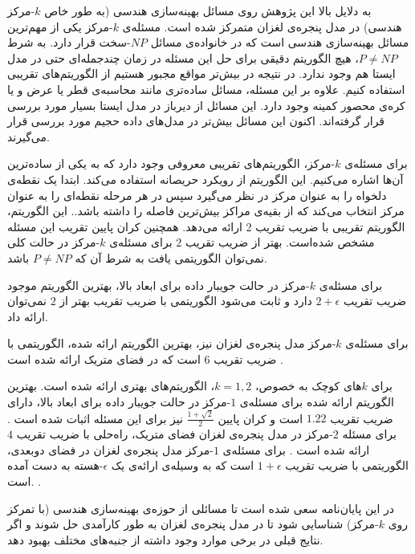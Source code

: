   به دلایل بالا این پژوهش روی مسائل بهینه‌سازی هندسی (به طور خاص $k$-مرکز هندسی) در مدل پنجره‌ی لغزان متمرکز شده است.
مسئله‌ی $k$-مرکز یکی از مهم‌ترین مسائل بهینه‌سازی هندسی است که در خانواده‌ی مسائل $NP$-سخت قرار دارد. به شرط $P \neq NP$، هیچ الگوریتم دقیقی برای حل این مسئله در زمان چندجمله‌ای حتی در مدل ایستا هم وجود ندارد. در نتیجه در بیش‌تر مواقع مجبور هستیم از الگوریتم‌های تقریبی   استفاده کنیم.
علاوه بر این مسئله، مسائل ساده‌تری مانند محاسبه‌ی قطر یا عرض و یا کره‌ی محصور کمینه وجود دارد. این مسائل  از دیرباز در مدل ایستا بسیار مورد بررسی قرار گرفته‌اند. اکنون این مسائل بیش‌تر در مدل‌های داده حجیم مورد بررسی قرار می‌گیرند.

برای مسئله‌ی $k$-مرکز، الگوریتم‌های تقریبی معروفی وجود دارد که به یکی از ساده‌ترین آن‌ها اشاره می‌کنیم.
این الگوریتم از رویکرد حریصانه  استفاده می‌کند.  ابتدا یک نقطه‌ی دلخواه را به عنوان مرکز در نظر می‌گیرد سپس در هر مرحله نقطه‌ای را به عنوان مرکز انتخاب می‌کند که از بقیه‌ی مراکز بیش‌ترین فاصله را داشته باشد..
این الگوریتم، الگوریتم تقریبی با ضریب تقریب 2 ارائه می‌دهد.
همچنین کران پایین تقریب این مسئله مشخص شده‌است. بهتر از ضریب تقریب $2$  برای مسئله‌ی $k$-مرکز در حالت کلی نمی‌توان الگوریتمی یافت به شرط آن که $P \neq NP$ باشد.

برای مسئله‌ی $k$-مرکز در حالت جویبار داده برای ابعاد بالا، بهترین الگوریتم موجود ضریب تقریب $2 + \epsilon$ دارد  و ثابت می‌شود الگوریتمی با ضریب تقریب بهتر از $2$ نمی‌توان ارائه داد.

برای مسئله‌ی $k$-مرکز مدل پنجره‌ی لغزان نیز، بهترین الگوریتم ارائه شده، الگوریتمی با ضریب تقریب $6$ است که  در فضای متریک ارائه شده است . 

برای $k$های کوچک به خصوص، $k =1, 2$، الگوریتم‌های بهتری ارائه شده است. بهترین الگوریتم ارائه شده برای مسئله‌ی $1$-مرکز در حالت جویبار داده برای ابعاد بالا، دارای ضریب تقریب $1.22$ است و کران پایین $\frac{1 + \sqrt{2}}{2}$ نیز برای این مسئله اثبات شده است . برای مسئله $2$-مرکز در مدل پنجره‌ی لغزان فضای متریک، راه‌حلی با ضریب تقریب $4$ ارائه شده است . برای مسئله‌ی $1$-مرکز مدل پنجره‌ی لغزان در فضای دوبعدی، الگوریتمی با ضریب تقریب $1+ \epsilon$ است که به وسیله‌ی ارائه‌ی یک $\epsilon$-هسته به دست آمده است. .


در این پایان‌نامه سعی شده است تا مسائلی از حوزه‌ی بهینه‌سازی هندسی (با تمرکز روی $k$-مرکز) شناسایی شود تا در مدل پنجره‌ی لغزان به طور کارآمدی حل شوند و اگر نتایج قبلی در برخی موارد وجود داشته از جنبه‌های مختلف بهبود دهد.

